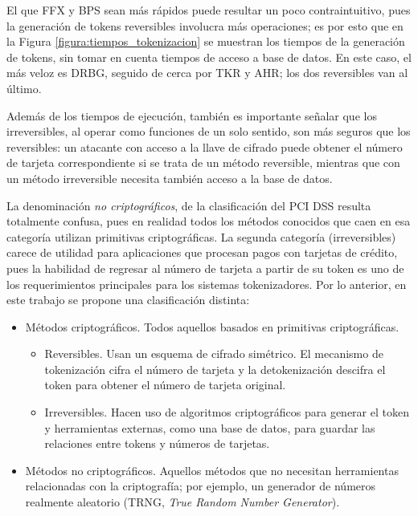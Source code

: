\documentclass[conference]{IEEEtran}
\begin{document}
  El que FFX y BPS sean más rápidos puede resultar un poco contraintuitivo, pues
  la generación de tokens reversibles involucra más operaciones; es por esto que
  en la Figura \ref{figura:tiempos_tokenizacion} se muestran los tiempos de la
  generación de tokens, sin tomar en cuenta tiempos de acceso a base de datos.
  En este caso, el más veloz es DRBG, seguido de cerca por TKR y AHR; los dos
  reversibles van al último.

  Además de los tiempos de ejecución, también es importante señalar que los
  irreversibles, al operar como funciones de un solo sentido, son más seguros
  que los reversibles: un atacante con acceso a la llave de cifrado puede
  obtener el número de tarjeta correspondiente si se trata de un método
  reversible, mientras que con un método irreversible necesita también acceso a
  la base de datos.

  La denominación \textit{no criptográficos}, de la clasificación del PCI DSS
  resulta totalmente confusa, pues en realidad todos los métodos conocidos que
  caen en esa categoría utilizan primitivas criptográficas. La segunda categoría
  (irreversibles) carece de utilidad para aplicaciones que procesan pagos con
  tarjetas de crédito, pues la habilidad de regresar al número de tarjeta a
  partir de su token es uno de los requerimientos principales para los sistemas
  tokenizadores. Por lo anterior, en este trabajo se propone una clasificación
  distinta:

  \begin{itemize}
    \item Métodos criptográficos. Todos aquellos basados en primitivas
      criptográficas.
      \begin{itemize}
        \item Reversibles. Usan un esquema de cifrado simétrico. El mecanismo de
          tokenización cifra el número de tarjeta y la detokenización descifra
          el token para obtener el número de tarjeta original.
        \item Irreversibles. Hacen uso de algoritmos criptográficos para generar
	        el token y herramientas externas, como una base de datos, para guardar
          las relaciones entre tokens y números de tarjetas.
      \end{itemize}
    \item Métodos no criptográficos. Aquellos  métodos que no necesitan
      herramientas relacionadas con la criptografía; por ejemplo, un generador
      de números realmente aleatorio (TRNG, \textit{True Random Number
      Generator}).
  \end{itemize}
\end{document}

